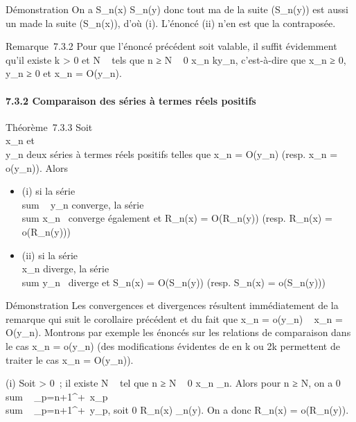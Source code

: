 \documentclass[]{article}
\begin{document}
Démonstration On a S\_n(x) \leq S\_n(y) donc tout ma\jmathorant
de la suite (S\_n(y)) est aussi un ma\jmathorant de la suite
(S\_n(x)), d'où (i). L'énoncé (ii) n'en est que la contraposée.

Remarque~7.3.2 Pour que l'énoncé précédent soit valable, il suffit
évidemment qu'il existe k \textgreater{} 0 et N \in {}~ tels que n ≥ N \rigtharrow~ 0 \leq
x\_n \leq ky\_n, c'est-à-dire que x\_n ≥ 0,
y\_n ≥ 0 et x\_n = O(y\_n).

\paragraph{7.3.2 Comparaison des séries à termes réels positifs}

Théorème~7.3.3 Soit \\\sum
 x\_n et \\\sum
 y\_n deux séries à termes réels positifs telles que
x\_n = O(y\_n) (resp. x\_n = o(y\_n)).
Alors

\begin{itemize}
\itemsep1pt\parskip0pt
\item
  (i) si la série \\sum ~
  y\_n converge, la série
  \\sum  x\_n~
  converge également et R\_n(x) = O(R\_n(y)) (resp.
  R\_n(x) = o(R\_n(y)))
\item
  (ii) si la série \\\sum
   x\_n diverge, la série
  \\sum  y\_n~
  diverge et S\_n(x) = O(S\_n(y)) (resp. S\_n(x)
  = o(S\_n(y)))
\end{itemize}

Démonstration Les convergences et divergences résultent immédiatement de
la remarque qui suit le corollaire précédent et du fait que x\_n
= o(y\_n) \rigtharrow~ x\_n = O(y\_n). Montrons par exemple
les énoncés sur les relations de comparaison dans le cas x\_n =
o(y\_n) (des modifications évidentes de \epsilon en k ou 2k permettent
de traiter le cas x\_n = O(y\_n)).

(i) Soit \epsilon \textgreater{} 0~; il existe N \in {}~ tel que n ≥ N \rigtharrow~ 0 \leq
x\_n \leq \epsilony\_n. Alors pour n ≥ N, on a 0
\leq\\sum ~
\_p=n+1^+\infty~x\_p \leq
\epsilon\\sum ~
\_p=n+1^+\infty~y\_p, soit 0 \leq R\_n(x) \leq
\epsilonR\_n(y). On a donc R\_n(x) = o(R\_n(y)).
\end{document}
